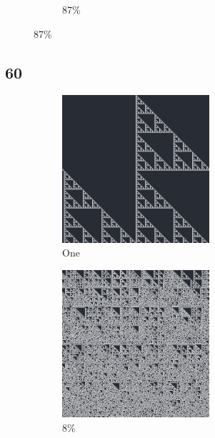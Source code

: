 \documentclass[12pt, fleqn]{report}                             %
\theoremstyle{break}                                            %
\begin{document}
\begin{figure}[ht!]
\begin{subfigure}[b]{0.4\linewidth}
          \caption{87\%}
        \end{subfigure}
      \end{figure}


      \clearpage
      \subsection{60}
      \begin{figure}[ht!]
        \centering
        \begin{subfigure}[b]{0.4\linewidth}
          \includegraphics[width=0.6\textwidth]{Images/60/a.png}
          \caption{One}
        \end{subfigure}
        \begin{subfigure}[b]{0.4\linewidth}
          \includegraphics[width=0.6\textwidth]{Images/60/b.png}
          \caption{8\%}
        \end{subfigure}
        \begin{subfigure}[b]{0.4\linewidth}

\end{subfigure}
\end{figure}
\end{document}
